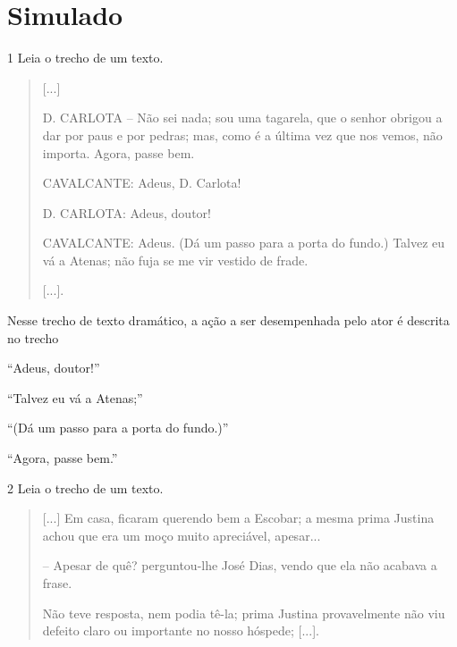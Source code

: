 \chapter[Simulado 2]{Simulado}

\num{1} Leia o trecho de um texto.

\begin{quote}
{[}...{]}

D. CARLOTA – Não sei nada; sou uma tagarela, que o senhor obrigou a
dar por paus e por pedras; mas, como é a última vez que nos vemos, não
importa. Agora, passe bem.

CAVALCANTE: Adeus, D. Carlota!

D. CARLOTA: Adeus, doutor!

CAVALCANTE: Adeus. (Dá um passo para a porta do fundo.) Talvez eu vá a
Atenas; não fuja se me vir vestido de frade.

{[}...{]}.

\end{quote}

Nesse trecho de texto dramático, a ação a ser desempenhada pelo ator é descrita
no trecho

\begin{escolha}
\item “Adeus, doutor!”

\item “Talvez eu vá a Atenas;”

\item “(Dá um passo para a porta do fundo.)”

\item “Agora, passe bem.”
\end{escolha}


\num{2} Leia o trecho de um texto.

\begin{quote}
{[}...{]} Em casa, ficaram querendo bem a Escobar; a mesma prima
Justina achou que era um moço muito apreciável, apesar...

– Apesar de quê? perguntou-lhe José Dias, vendo que ela não acabava a frase.

Não teve resposta, nem podia tê-la; prima Justina provavelmente não viu
defeito claro ou importante no nosso hóspede; {[}...{]}.

\end{quote}

